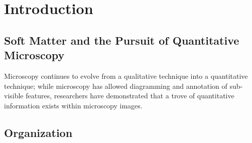 \chapter{Introduction}
\label{ch:intro}






\section{Soft Matter and the Pursuit of Quantitative Microscopy}

Microscopy continues to evolve from a qualitative technique into a
quantitative technique; while microscopy has allowed diagramming
and annotation of sub-visible features, researchers have demonstrated
that a trove of quantitative information exists within microscopy images.




\section{Organization}

